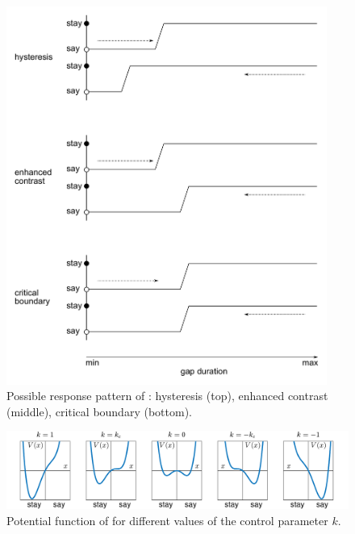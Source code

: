 \begin{figure}[p]
\includegraphics[width=10.5cm]{figures/ch3/tuller_etal_1994_response_patterns.pdf}
\caption[Possible response patterns of \citet{Tulleretal1994}.]{Possible response pattern of \citet{Tulleretal1994}: hysteresis (top), enhanced contrast (middle), critical boundary (bottom).}
\label{fig:tuller_response}
\end{figure}

\begin{figure}[p]
	\includegraphics[width=.95\textwidth]{figures/ch3/tuller_potential.pdf}
	\caption{Potential function of \citet{Tulleretal1994} for different values of the control parameter $k$.}
	\label{fig:tuller_potential}
\end{figure}


